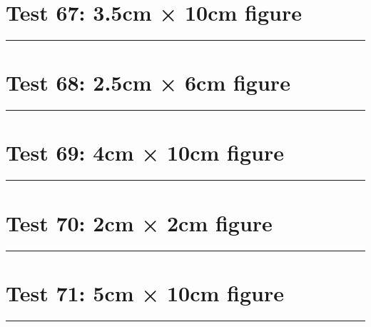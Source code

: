 \documentclass[a4paper,11pt]{article}
\begin{document}
\section*{Test 67: 3.5cm × 10cm figure}
\begin{swarmwrap}%
  \begin{minipage}[t]{3cm}
    \centering
    \rule{\linewidth}{10cm}
  \end{minipage}%
\end{swarmwrap}%
\swarmwrapnext
\lipsum[41]
\lipsum[42]
\lipsum[43]
\lipsum[44]
\lipsum[45]
\lipsum[46]
\section*{Test 68: 2.5cm × 6cm figure}
\begin{swarmwrap}%
  \begin{minipage}[t]{2cm}
    \centering
    \rule{\linewidth}{6cm}
  \end{minipage}%
\end{swarmwrap}%
\swarmwrapnext
\lipsum[16]
\lipsum[17]
\lipsum[18]
\lipsum[19]
\section*{Test 69: 4cm × 10cm figure}
\begin{swarmwrap}%
  \begin{minipage}[t]{4cm}
    \centering
    \rule{\linewidth}{10cm}
  \end{minipage}%
\end{swarmwrap}%
\swarmwrapnext
\lipsum[82]
\lipsum[83]
\lipsum[84]
\section*{Test 70: 2cm × 2cm figure}
\begin{swarmwrap}%
  \begin{minipage}[t]{2cm}
    \centering
    \rule{\linewidth}{2cm}
  \end{minipage}%
\end{swarmwrap}%
\swarmwrapnext
\lipsum[130]
\lipsum[131]
\lipsum[132]
\lipsum[133]
\lipsum[134]
\lipsum[135]
\section*{Test 71: 5cm × 10cm figure}
\begin{swarmwrap}%
  \begin{minipage}[t]{5cm}
    \centering
    \rule{\linewidth}{10cm}
  \end{minipage}%
\end{swarmwrap}%
\swarmwrapnext
\lipsum[16]
\lipsum[17]
\lipsum[18]
\lipsum[19]
\end{document}
